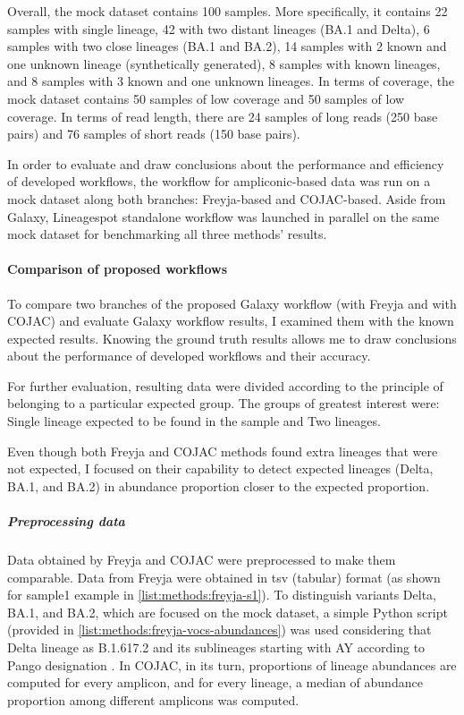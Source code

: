             Overall, the mock dataset contains 100 samples. More specifically, it contains 22 samples with single lineage, 42 with two distant lineages (BA.1 and Delta), 6 samples with two close lineages (BA.1 and BA.2), 14 samples with 2 known and one unknown lineage (synthetically generated), 8 samples with known lineages, and 8 samples with 3 known and one unknown lineages. In terms of coverage, the mock dataset contains 50 samples of low coverage and 50 samples of low coverage. In terms of read length, there are 24 samples of long reads (250 base pairs) and 76 samples of short reads (150 base pairs).
            
            In order to evaluate and draw conclusions about the performance and efficiency of developed workflows, the workflow for ampliconic-based data was run on a mock dataset along both branches: Freyja-based and COJAC-based. Aside from Galaxy, Lineagespot standalone workflow was launched in parallel on the same mock dataset for benchmarking all three methods' results.
            
            \paragraph{Comparison of proposed workflows} 
            To compare two branches of the proposed Galaxy workflow (with Freyja and with COJAC) and evaluate Galaxy workflow results, I examined them with the known expected results. Knowing the ground truth results allows me to draw conclusions about the performance of developed workflows and their accuracy. 
            
            For further evaluation, resulting data were divided according to the principle of belonging to a particular expected group. The groups of greatest interest were: Single lineage expected to be found in the sample and Two lineages.
            
            Even though both Freyja and COJAC methods found extra lineages that were not expected, I focused on their capability to detect expected lineages (Delta, BA.1, and BA.2) in abundance proportion closer to the expected proportion.

            
                \subparagraph{Preprocessing data} 
                Data obtained by Freyja and COJAC were preprocessed to make them comparable. Data from Freyja were obtained in \acrshort{tsv} (tabular) format (as shown for sample1 example in \cref{list:methods:freyja-s1}). To distinguish variants Delta, BA.1, and BA.2, which are focused on the mock dataset, a simple Python script (provided in \cref{list:methods:freyja-vocs-abundances}) was used considering that Delta lineage as B.1.617.2 and its sublineages starting with AY according to Pango designation \cite{otoole2021,covlineages}. In COJAC, in its turn, proportions of lineage abundances are computed for every amplicon, and for every lineage, a median of abundance proportion among different amplicons was computed.
                
